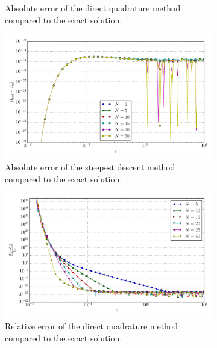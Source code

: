 \documentclass[a4paper,10pt]{article}
\begin{document}
\begin{figure}[ht!]
\begin{subfigure}[t]{0.5\linewidth}
    \caption{Absolute error of the direct quadrature method compared to the exact solution.}
    \label{fig:tp_1d_conv_eps_0_0_err_qr}
  \end{subfigure}
  \begin{subfigure}[t]{0.5\linewidth}
    \includegraphics[width=\linewidth]{./plots/tp_1d_conv_eps_0_0_err_nsd.pdf}
    \caption{Absolute error of the steepest descent method compared to the exact solution.}
    \label{fig:tp_1d_conv_eps_0_0_err_nsd}
  \end{subfigure}
  \begin{subfigure}[t]{0.5\linewidth}
    \includegraphics[width=\linewidth]{./plots/tp_1d_conv_eps_0_0_err_rel_qr.pdf}
    \caption{Relative error of the direct quadrature method compared to the exact solution.}
    \label{fig:tp_1d_conv_eps_0_0_err_qr}
  \end{subfigure}
  \begin{subfigure}[t]{0.5\linewidth}

\end{subfigure}
\end{figure}
\end{document}
